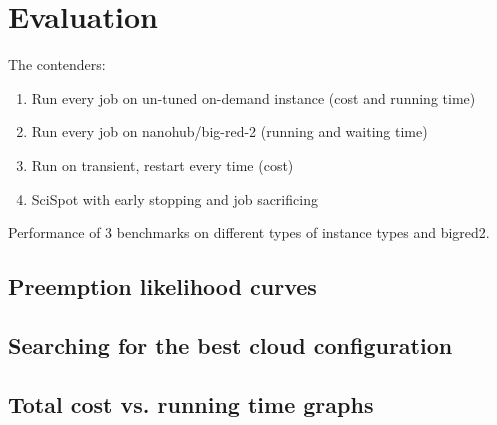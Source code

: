 \section{Evaluation}

The contenders:
\begin{enumerate}
\item Run every job on un-tuned on-demand instance (cost and running time)
\item Run every job on nanohub/big-red-2 (running and waiting time)
\item Run on transient, restart every time (cost)
\item SciSpot with early stopping and job sacrificing 
\end{enumerate}

Performance of 3 benchmarks on different types of instance types and bigred2.



\subsection{Preemption likelihood curves}


\subsection{Searching for the best cloud configuration}


\subsection{Total cost vs. running time graphs}


